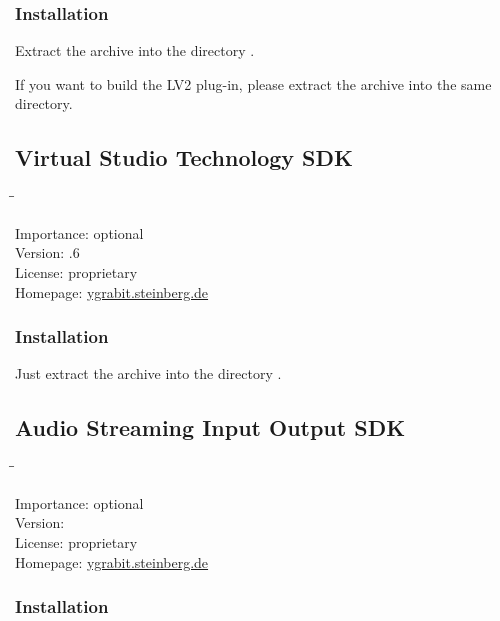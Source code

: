 \subsubsection{Installation}

Extract the archive into the directory .

If you want to build the LV2 plug-in, please extract the archive
 into the same directory.

\subsection{Virtual Studio Technology SDK}

\begin{tabbing}
  \hspace*{6em}\=\=\kill

  Importance:  \> optional \\
  Version:     .6 \\
  License:     \> proprietary \\
  Homepage:    \> \href{http://ygrabit.steinberg.de/}{ygrabit.steinberg.de}
\end{tabbing}

\subsubsection{Installation}

Just extract the archive into the directory
.

\subsection{Audio Streaming Input Output SDK}

\begin{tabbing}
  \hspace*{6em}\=\=\kill

  Importance:  \> optional \\
  Version:      \\
  License:     \> proprietary \\
  Homepage:    \> \href{http://ygrabit.steinberg.de/}{ygrabit.steinberg.de}
\end{tabbing}

\subsubsection{Installation}

